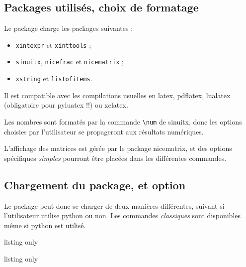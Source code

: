 \documentclass[a4paper,11pt]{article}
\begin{document}
\subsection{Packages utilisés, choix de formatage}

\begin{noteblock}
Le package charge les packages suivantes :

\begin{itemize}
	\item \texttt{xintexpr} et \texttt{xinttools} ;
	\item \texttt{sinuitx}, \texttt{nicefrac} et \texttt{nicematrix} ;
	\item \texttt{xstring} et \texttt{listofitems}.
\end{itemize}

Il est compatible avec les compilations usuelles en \textsf{latex}, \textsf{pdflatex}, \textsf{lualatex} (obligatoire pour \textsf{pyluatex} !!) ou \textsf{xelatex}.
\end{noteblock}

\begin{importantblock}
Les nombres sont formatés par la commande \texttt{\textbackslash num} de \textsf{sinuitx}, donc les options choisies par l'utilisateur se propageront aux résultats numériques.

\smallskip

L'affichage des matrices est gérée par le package \textsf{nicematrix}, et des options spécifiques \textit{simples} pourront être placées dans les différentes commandes.
\end{importantblock}

\subsection{Chargement du package, et option}

\begin{importantblock}
Le package peut donc se charger de deux manières différentes, suivant si l'utilisateur utilise \textsf{python} ou non. Les commandes \textit{classiques} sont disponibles même si \textsf{python} est utilisé.
\end{importantblock}

\begin{PresentationCode}{listing only}
\usepackage{ResolSysteme}
\end{PresentationCode}

\begin{PresentationCode}{listing only}
\usepackage[options]{pyluatex}
\usepackage[pyluatex]{ResolSysteme}
\end{PresentationCode}
\end{document}
